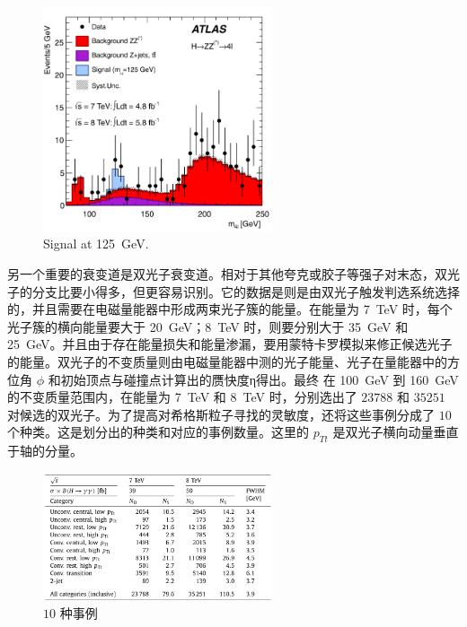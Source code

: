 \documentclass[oneside,a4paper,openany,11pt]{ctexbook}
\begin{document}
\begin{figure}[htbp]
    \centering
    \includegraphics[width=0.6\textwidth]{pic/events.png}
    \caption{Signal at \qty{125}{GeV}.}
    \label{fig:events}
\end{figure}

另一个重要的衰变道是双光子衰变道。相对于其他夸克或胶子等强子对末态，双光子的分支比要小得多，但更容易识别。它的数据是则是由双光子触发判选系统选择的，并且需要在电磁量能器中形成两束光子簇的能量。在能量为 \qty{7}{TeV} 时，每个光子簇的横向能量要大于 \qty{20}{GeV}；\qty{8}{TeV} 时，则要分别大于 \qty{35}{GeV} 和 \qty{25}{GeV}。并且由于存在能量损失和能量渗漏，要用蒙特卡罗模拟来修正候选光子的能量。双光子的不变质量则由电磁量能器中测的光子能量、光子在量能器中的方位角 $\phi$ 和初始顶点与碰撞点计算出的赝快度η得出。最终 在 \qty{100}{GeV} 到 \qty{160}{GeV} 的不变质量范围内，在能量为 \qty{7}{TeV} 和 \qty{8}{TeV} 时，分别选出了 $23788$ 和 $35251$ 对候选的双光子。为了提高对希格斯粒子寻找的灵敏度，还将这些事例分成了 $10$ 个种类。这是划分出的种类和对应的事例数量。这里的 $p_{Tt}$ 是双光子横向动量垂直于轴的分量。

\begin{figure}[htbp]
    \centering
    \includegraphics[width=0.6\textwidth]{pic/10.png}
    \caption{$10$ 种事例}
    \label{fig:10}
\end{figure}
\end{document}
